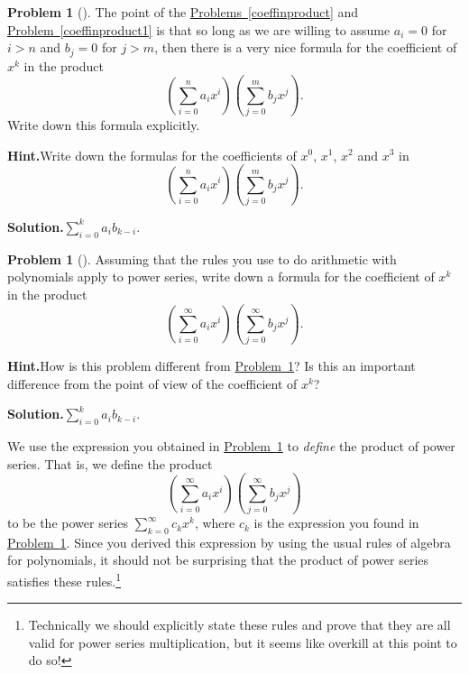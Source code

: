 \documentclass[10pt,]{book}
\theoremstyle{plain}
\theoremstyle{definition}
\newtheorem{activity}[project]{Problem}
\theoremstyle{definition}
\numberwithin{equation}{chapter}
\begin{document}
\begin{activity}[]\label{coeffinproduct2}
The point of the \hyperref[coeffinproduct]{Problems~\ref{coeffinproduct}} and \hyperref[coeffinproduct1]{Problem~\ref{coeffinproduct1}} is that so long as we are willing to assume \(a_i=0\) for \(i>n\) and \(b_j =0\) for \(j>m\), then there is a very nice formula for the coefficient of \(x^k\) in the product%
\begin{equation*}
\left(\sum_{i=0}^n a_ix^i\right)\left(\sum_{j=0}^m b_jx^j\right).
\end{equation*}
Write down this formula explicitly.%
\par\medskip\noindent%
\textbf{Hint.}\quad Write down the formulas for the coefficients of \(x^0\), \(x^1\), \(x^2\) and \(x^3\) in%
\begin{equation*}
\left(\sum_{i=0}^n a_ix^i\right)\left(\sum_{j=0}^m b_jx^j\right)\text{.}
\end{equation*}
%
\par\medskip\noindent%
\textbf{Solution.}\quad \(\sum_{i=0}^k a_ib_{k-i}\).%
\end{activity}
\begin{activity}[]\label{coeffinpowerseries}
Assuming that the rules you use to do arithmetic with polynomials apply to power series, write down a formula for the coefficient of \(x^k\) in the product%
\begin{equation*}
\left(\sum_{i=0}^\infty a_ix^i\right)\left(\sum_{j=0}^\infty
b_jx^j\right)\text{.}
\end{equation*}
%
\par\medskip\noindent%
\textbf{Hint.}\quad How is this problem different from \hyperref[coeffinproduct2]{Problem~\ref{coeffinproduct2}}? Is this an important difference from the point of view of the coefficient of \(x^k\)?%
\par\medskip\noindent%
\textbf{Solution.}\quad \(\sum_{i=0}^k a_ib_{k-i}\).%
\end{activity}
We use the expression you obtained in \hyperref[coeffinpowerseries]{Problem~\ref{coeffinpowerseries}} to \emph{define} the product of power series. That is, we define the product%
\begin{equation*}
\left(\sum_{i=0}^\infty a_ix^i\right)\left(\sum_{j=0}^\infty
b_jx^j\right)
\end{equation*}
to be the power series \(\sum_{k=0}^\infty c_k x^k\), where \(c_k\) is the expression you found in \hyperref[coeffinpowerseries]{Problem~\ref{coeffinpowerseries}}. Since you derived this expression by using the usual rules of algebra for polynomials, it should not be surprising that the product of power series satisfies these rules.\footnote{Technically we should explicitly state these rules and prove that they are all valid for power series multiplication, but it seems like overkill at this point to do so!\label{fn-12}}%
\typeout{************************************************}
\typeout{************************************************}
\end{document}
